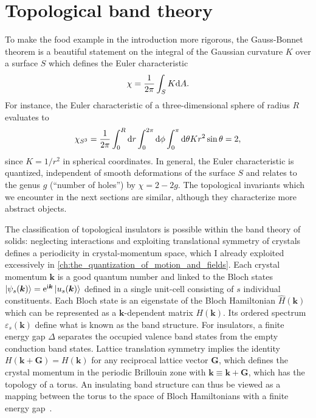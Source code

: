 \section{Topological band theory}
\label{sec:topological_band_theory}
%
%
To make the food example in the introduction more rigorous, the Gauss-Bonnet theorem is a beautiful statement on the integral of the Gaussian curvature $K$ over a surface $S$ which defines the Euler characteristic~\cite{Nakahara1990}
\begin{align}
    \chi = \frac1{2\pi}\int_S K\mathrm d A.
\end{align}
For instance, the Euler characteristic of a three-dimensional sphere of radius $R$ evaluates to
\begin{align}
    \chi_{S^3} = \frac1{2\pi}\int_0^R\mathrm d r\int_0^{2\pi}\mathrm d\phi \int_0^\pi\mathrm d\theta K r^2\sin\theta = 2,
\end{align}
since $K=1/r^2$ in spherical coordinates.
In general, the Euler characteristic is quantized, independent of smooth deformations of the surface $S$ and relates to the genus $g$ (``number of holes'') by $\chi=2-2g$.
The topological invariants which we encounter in the next sections are similar, although they characterize more abstract objects.

The classification of topological insulators is possible within the band theory of solids: neglecting interactions and exploiting translational symmetry of crystals defines a periodicity in crystal-momentum space, which I already exploited excessively in \cref{ch:the_quantization_of_motion_and_fields}.
Each crystal momentum ${\bm k}$ is a good quantum number and linked to the Bloch states $\ket{\psi_s(\bm k)}=\mathrm e^{\mathrm i\bm k}\ket{u_s(\bm k)}$ defined in a single unit-cell consisting of $s$ individual constituents.
Each Bloch state is an eigenstate of the Bloch Hamiltonian $\hat H(\bm k)$ which can be represented as a $\bm k$-dependent matrix $H(\bm k)$.
Its ordered spectrum $\varepsilon_s(\bm k)$ define what is known as the band structure.
For insulators, a finite energy gap $\Delta$ separates the occupied valence band states from the empty conduction band states.
Lattice translation symmetry implies the identity $H(\bm k + \bm G) = H(\bm k)$ for any reciprocal lattice vector $\bm G$, which defines the crystal momentum in the periodic Brillouin zone with $\bm k\equiv \bm k+\bm G$, which has the topology of a torus.
An insulating band structure can thus be viewed as a mapping between the torus to the space of Bloch Hamiltonians with a finite energy gap~\cite{Kane2013}.

